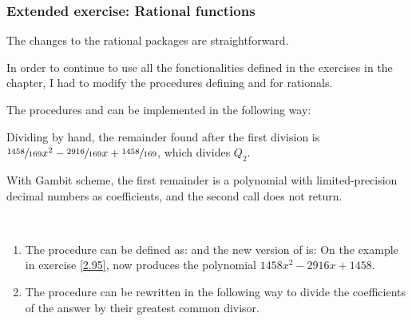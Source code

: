 \subsubsection{Extended exercise: Rational functions}

\begin{exe}[2.93]
    The changes to the rational packages are straightforward.

    \begin{comp}
        In order to continue to use all the fonctionalities defined in the 
        exercises in the chapter, I had to modify the procedures defining 
         and  for rationals.
    \end{comp}
\end{exe}

\begin{exe}[2.94]
    The procedures  and  can be implemented 
    in the following way:
\end{exe}

\begin{exe}[2.95]
    \label{2.95}
    Dividing by hand, the remainder found after the first division is
    $\sfrac{1458}{169} x^2 - \sfrac{2916}{169} x + \sfrac{1458}{169}$, which 
    divides $Q_2$.

    With Gambit scheme, the first remainder is a polynomial with 
    limited-precision decimal numbers as coefficients, and the second call does not 
    return.
\end{exe}

\begin{exe}[2.96]
    \ \vspace{-20pt}
    \begin{enumerate}
        \item The procedure  can be defined as:
            and the new version of  is:
            On the example in exercise \ref{2.95}, 
             now produces the polynomial $1458 x^2 
            - 2916 x + 1458$.
        \item The procedure can be rewritten in the following way to divide the 
            coefficients of the answer by their greatest common divisor.
    \end{enumerate}
\end{exe}

